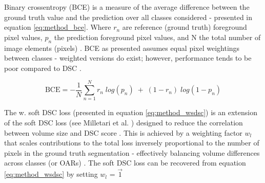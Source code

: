 
%
%
%
%


Binary crossentropy (BCE) is a measure of the average difference between the ground truth value and the prediction over all classes considered \cite{taghanaki2018} - presented in equation \ref{eq:method_bce}. Where $r_{n}$ are reference (ground truth) foreground pixel values, $p_{n}$ the prediction foreground pixel values, and N the total number of image elements (pixels) \cite{Sudre_2017}. BCE as presented assumes equal pixel weightings between classes \cite{Sudre_2017} - weighted versions do exist; however, performance tends to be poor compared to DSC \cite{Bertels2019}.

\begin{equation}
\textrm{BCE} = -\frac{1}{N}\sum_{n=1}^{N}r_{n} \; log(p_{n}) \; + \; (1-r_{n}) \; log(1-p_{n})
\label{eq:method_bce}
\end{equation}

The w. soft DSC loss (presented in equation \ref{eq:method_wsdsc}) is an extension of the soft DSC loss (see Milletari et al. \cite{milletari2016}) designed to reduce the correlation between volume size and DSC score \cite{Sudre_2017}. This is achieved by a weighting factor $w_{l}$ that scales contributions to the total loss inversely proportional to the number of pixels in the ground truth segmentation - effectively balancing volume differences across classes (or OARs) \cite{Sudre_2017}. The soft DSC loss can be recovered from equation \ref{eq:method_wsdsc} by setting $w_{l}$ = $\vec{1}$

